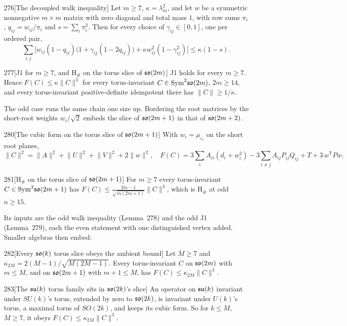 \begin{Lem}{276}[The decoupled walk inequality]
Let $m\ge7$, $\kappa=\lambda_m^2$, and let $w$ be a symmetric nonnegative $m\times m$ matrix with zero diagonal and total mass $1$, with row sums $\pi_i$, $q_{ij}=w_{ij}/\pi_i$ and $s=\sum_i\pi_i^2$. Then for every choice of $\gamma_{ij}\in[0,1]$, one per ordered pair,
\[
\sum_{i,j}\Big[w_{ij}(1-q_{ij})\big(1+\gamma_{ij}(1-2q_{ij})\big)+\kappa w_{ij}^2(1-\gamma_{ij}^2)\Big]\le\kappa(1-s).
\]
\end{Lem}

\begin{Lem}{277}[J1 for $m\ge7$, and H$_\#$ on the torus slice of $\mathfrak{so}(2m)$]
J1 holds for every $m\ge7$. Hence $F(C)\le\kappa\lVert C\rVert^3$ for every torus-invariant $C\in\mathrm{Sym}^2\mathfrak{so}(2m)$, $2m\ge14$, and every torus-invariant positive-definite idempotent there has $\lVert C\rVert\ge1/\kappa$.
\end{Lem}

The odd case runs the same chain one size up. Bordering the root matrices by the short-root weights $w_i/\sqrt2$ embeds the slice of $\mathfrak{so}(2m+1)$ in that of $\mathfrak{so}(2m+2)$.

\begin{Lem}{280}[The cubic form on the torus slice of $\mathfrak{so}(2m+1)$]
With $w_i=\mu_{\varepsilon_i}$ on the short root planes,
\[
\lVert C\rVert^2=\lVert A\rVert^2+\lVert U\rVert^2+\lVert V\rVert^2+2\lVert w\rVert^2,\quad F(C)=3\sum_iA_{ii}(d_i+w_i^2)-3\sum_{i\ne j}A_{ij}P_{ij}Q_{ij}+T+3\,w^{\mathsf T}Pw .
\]
\end{Lem}

\begin{Lem}{281}[H$_\#$ on the torus slice of $\mathfrak{so}(2m+1)$]
For $m\ge7$ every torus-invariant $C\in\mathrm{Sym}^2\mathfrak{so}(2m+1)$ has $F(C)\le\frac{2m-1}{\sqrt{m(2m+1)}}\lVert C\rVert^3$, which is H$_\#$ at odd $n\ge15$.
\end{Lem}

Its inputs are the odd walk inequality (Lemma~278) and the odd J1 (Lemma~279), each the even statement with one distinguished vertex added. Smaller algebras then embed:

\begin{Lem}{282}[Every $\mathfrak{so}(k)$ torus slice obeys the ambient bound]
Let $M\ge7$ and $\kappa_{2M}=2(M-1)/\sqrt{M(2M-1)}$. Every torus-invariant $C$ on $\mathfrak{so}(2m)$ with $m\le M$, and on $\mathfrak{so}(2m+1)$ with $m+1\le M$, has $F(C)\le\kappa_{2M}\lVert C\rVert^3$.
\end{Lem}

\begin{Lem}{283}[The $\mathfrak{su}(k)$ torus family sits in $\mathfrak{so}(2k)$'s slice]
An operator on $\mathfrak{su}(k)$ invariant under $SU(k)$'s torus, extended by zero to $\mathfrak{so}(2k)$, is invariant under $U(k)$'s torus, a maximal torus of $SO(2k)$, and keeps its cubic form. So for $k\le M$, $M\ge7$, it obeys $F(C)\le\kappa_{2M}\lVert C\rVert^3$.
\end{Lem}

